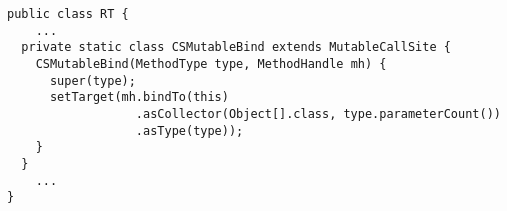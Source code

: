 {\tiny \begin{verbatim}
public class RT {
    ...
  private static class CSMutableBind extends MutableCallSite {
    CSMutableBind(MethodType type, MethodHandle mh) {
      super(type);
      setTarget(mh.bindTo(this)
                  .asCollector(Object[].class, type.parameterCount())
                  .asType(type));
    }
  }
    ...
}
\end{verbatim} }